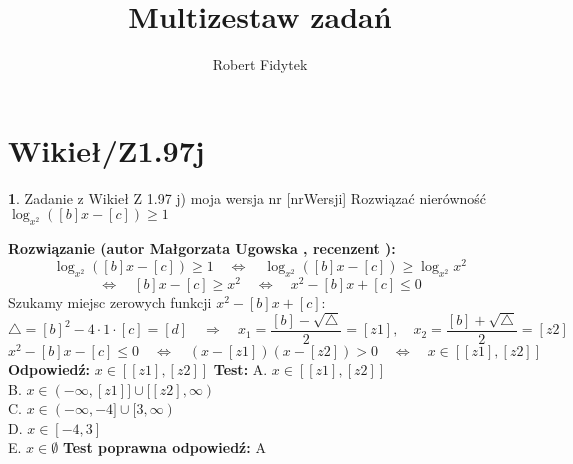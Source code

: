 \documentclass[12pt, a4paper]{article}
\title{Multizestaw zadań}
\author{Robert Fidytek}
\date{}
\theoremstyle{definition} %
\newtheorem{zad}{}
\newcommand{\kategoria}[1]{\section{#1}} %
\newcommand{\zadStart}[1]{\begin{zad}#1\newline} %
\newcommand{\zadStop}{\end{zad}}   %
\newcommand{\rozwStart}[2]{\noindent \textbf{Rozwiązanie (autor #1 , recenzent #2): }\newline} %
\newcommand{\rozwStop}{\newline}                                            %
\newcommand{\odpStart}{\noindent \textbf{Odpowiedź:}\newline}    %
\newcommand{\odpStop}{\newline}                                             %
\newcommand{\testStart}{\noindent \textbf{Test:}\newline} %
\newcommand{\testStop}{\newline} %
\newcommand{\kluczStart}{\noindent \textbf{Test poprawna odpowiedź:}\newline} %
\newcommand{\kluczStop}{\newline} %
\begin{document}
\maketitle


\kategoria{Wikieł/Z1.97j}
\zadStart{Zadanie z Wikieł Z 1.97 j) moja wersja nr [nrWersji]}
Rozwiązać nierówno\'sć $\log_{x^2}{([b]x-[c])} \ge 1$
\zadStop
\rozwStart{Małgorzata Ugowska}{}
$$\log_{x^2}{([b]x-[c])} \ge 1 \quad \Longleftrightarrow \quad \log_{x^2}{([b]x-[c])} \ge \log_{x^2}{x^2} $$
$$\Longleftrightarrow \quad [b]x-[c] \ge x^2 \quad \Longleftrightarrow \quad x^2 -[b]x+[c] \le 0$$
Szukamy miejsc zerowych funkcji $x^2-[b]x+[c]$:
$$ \bigtriangleup = [b]^2-4 \cdot 1 \cdot [c] = [d] \quad  \Longrightarrow \quad x_1=\frac{[b]-\sqrt{\bigtriangleup}}{2} = [z1], \quad x_2=\frac{[b]+\sqrt{\bigtriangleup}}{2} = [z2]$$
$$x^2-[b]x-[c] \le 0 \quad \Longleftrightarrow \quad (x-[z1])(x-[z2])>0 \quad \Longleftrightarrow \quad x \in [[z1],[z2]]$$
\rozwStop
\odpStart
$x \in [[z1],[z2]]$
\odpStop
\testStart
A. $x \in [[z1],[z2]]$\\
B. $x \in (-\infty, [z1]] \cup [[z2],\infty)$\\
C. $x \in (-\infty, -4] \cup [3,\infty)$\\
D. $x \in [-4,3]$\\
E. $x \in \emptyset$
\testStop
\kluczStart
A
\kluczStop
\end{document}
